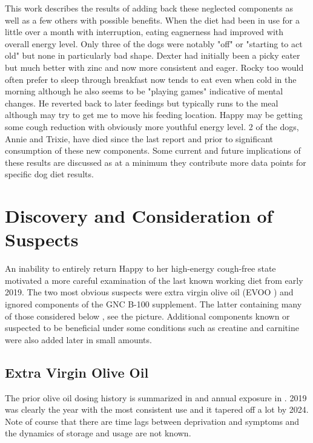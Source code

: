 
This work describes the results of adding back these neglected components
as well as a few others with possible benefits.
When the diet had  been in use for a little over a month
with interruption, eating eagnerness had improved with overall energy
level. Only three of the dogs were notably "off" or "starting to act old"  
but none in
particularly bad shape. Dexter had initially been a picky
eater but much better with zinc and now more consistent and eager.
Rocky too would often prefer to sleep through breakfast now 
tends to eat  even when cold in the morning although he
also seems to be "playing games" indicative of mental changes. 
He reverted back to later feedings but typically runs to the 
meal although may try to get me to move his feeding location.
Happy  may be getting some
cough reduction with obviously more youthful energy level.  
2 of the dogs, Annie and Trixie,  have died since the last report
and prior to significant consumption of these new components. 
Some current and future implications of these results are discussed
as at a minimum they contribute more data points for
specific dog diet results. 

\section{ Discovery and Consideration of Suspects }

An inability to entirely return Happy to her high-energy cough-free
state motivated a more careful examination of the last known working
diet from early 2019. The two most obvious suspects were extra
virgin olive oil (EVOO ) and ignored components of the GNC B-100
supplement. The latter containing many of those considered below 
,  see the picture.
Additional components known or suspected to be beneficial
under some conditions such as creatine and carnitine were
also added later in small amounts. 

\subsection{Extra Virgin Olive Oil }

The prior olive oil dosing history is summarized
in  and annual exposure in .
2019 was clearly the year with the most consistent use
and it tapered off a lot by 2024. Note of course that 
there are time lags between deprivation and symptoms
and the dynamics of storage and usage are not known. 

